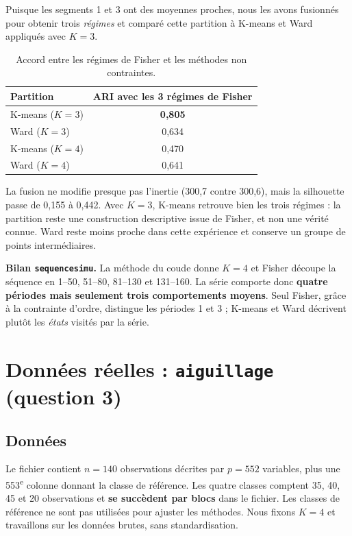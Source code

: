 \documentclass[10pt,a4paper]{article}
\newcommand{\synthese}[1]{\begin{boitebilan}\small #1\end{boitebilan}}
\begin{document}
Puisque les segments 1 et 3 ont des moyennes proches, nous les avons fusionnés pour
obtenir trois \emph{régimes} et comparé cette partition à K-means et Ward appliqués
avec $K=3$.

\begin{table}[H]
\centering
\small
\begin{tabular}{@{}lc@{}}
\toprule
\textbf{Partition} & \textbf{ARI avec les 3 régimes de Fisher} \\
\midrule
K-means ($K=3$) & \textbf{0,805} \\
Ward ($K=3$)    & 0,634 \\
K-means ($K=4$) & 0,470 \\
Ward ($K=4$)    & 0,641 \\
\bottomrule
\end{tabular}
\caption{Accord entre les régimes de Fisher et les méthodes non contraintes.}
\end{table}

La fusion ne modifie presque pas l'inertie (300,7 contre 300,6), mais la
silhouette passe de 0,155 à 0,442. Avec $K=3$, K-means retrouve bien les trois
régimes : la partition reste une construction descriptive issue de Fisher,
et non une vérité connue. Ward
reste moins proche dans cette expérience et conserve un groupe de points
intermédiaires.

\synthese{\textbf{Bilan \texttt{sequencesimu}.} La méthode du coude donne $K=4$ et
Fisher découpe la séquence en 1--50, 51--80, 81--130 et 131--160. La série comporte
donc \textbf{quatre périodes mais seulement trois comportements moyens}. Seul Fisher,
grâce à la contrainte d'ordre, distingue les périodes 1 et 3 ; K-means et Ward
décrivent plutôt les \emph{états} visités par la série.}

\clearpage
\section[Données réelles : aiguillage]{Données réelles : \texttt{aiguillage} (question 3)}

\subsection{Données}

Le fichier contient $n=140$ observations décrites par $p=552$ variables, plus une
553\textsuperscript{e} colonne donnant la classe de référence. Les quatre classes
comptent 35, 40, 45 et 20 observations et \textbf{se succèdent par blocs} dans le
fichier. Les classes de référence ne sont pas utilisées pour ajuster les méthodes. Nous fixons
$K=4$ et travaillons sur les données brutes, sans standardisation.
\end{document}
